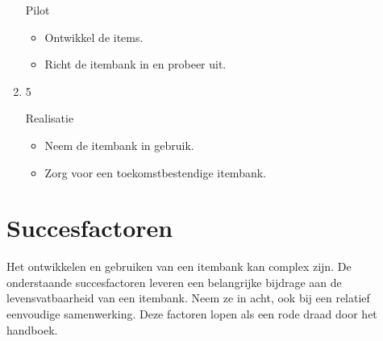 \documentclass[
]{book}
\providecommand{\tightlist}{%
  \setlength{\itemsep}{0pt}\setlength{\parskip}{0pt}}
\begin{document}
\begin{enumerate}
  Pilot

  \begin{itemize}
  \tightlist
  \item
    Ontwikkel de items.\\
  \item
    Richt de itembank in en probeer uit.\\
  \end{itemize}
\item
  5

  Realisatie

  \begin{itemize}
  \tightlist
  \item
    Neem de itembank in gebruik.\\
  \item
    Zorg voor een toekomstbestendige itembank.
  \end{itemize}
\end{enumerate}

\hypertarget{succesfactoren}{%
\section{Succesfactoren}\label{succesfactoren}}

Het ontwikkelen en gebruiken van een itembank kan complex zijn. De onderstaande succesfactoren leveren een belangrijke bijdrage aan de levensvatbaarheid van een itembank. Neem ze in acht, ook bij een relatief eenvoudige samenwerking. Deze factoren lopen als een rode draad door het handboek.
\end{document}
